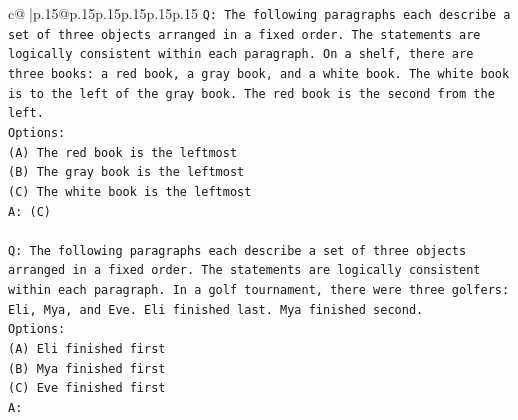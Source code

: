 \documentclass{article}
\begin{document}
{\begin{supertabular}{c@{$\;$}|p{.15\linewidth}@{}p{.15\linewidth}p{.15\linewidth}p{.15\linewidth}p{.15\linewidth}p{.15\linewidth}}
{{{\texttt{Q: The following paragraphs each describe a set of three objects arranged in a fixed order. The statements are logically consistent within each paragraph. On a shelf, there are three books: a red book, a gray book, and a white book. The white book is to the left of the gray book. The red book is the second from the left.} \\
\texttt{Options:} \\
\texttt{(A) The red book is the leftmost} \\
\texttt{(B) The gray book is the leftmost} \\
\texttt{(C) The white book is the leftmost} \\
\texttt{A: (C)} \\
\\ 
\texttt{Q: The following paragraphs each describe a set of three objects arranged in a fixed order. The statements are logically consistent within each paragraph. In a golf tournament, there were three golfers: Eli, Mya, and Eve. Eli finished last. Mya finished second.} \\
\texttt{Options:} \\
\texttt{(A) Eli finished first} \\
\texttt{(B) Mya finished first} \\
\texttt{(C) Eve finished first} \\
\texttt{A:} \\
            }
        }
    }
     \\ \\


\end{supertabular}}
\end{document}
